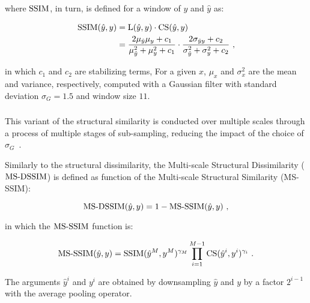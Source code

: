 \noindent where $\operatorname{SSIM}$, in turn, is defined for a window of $y$ and $\hat{y}$ as:

\begin{equation}
  \begin{aligned}
    \operatorname{SSIM}(\hat{y}, y)
     & = \operatorname{L}(\hat{y}, y) \cdot \operatorname{CS}(\hat{y}, y)                                                                                                                       \\
     & = \frac{2 \mu_{\hat{y}} \mu_{y} + c_1}{\mu_{\hat{y}}^2 + \mu_{y}^2 + c_1} \cdot \frac{2 \sigma_{\hat{y}y} + c_2}{\sigma_{\hat{y}}^2 + \sigma_{y}^2 + c_{2}}~\text{,}
  \end{aligned}
\end{equation}

\noindent in which $c_1$ and $c_2$ are stabilizing terms, 
For a given $x$, $\mu_{x}$ and $\sigma^2_{x}$ are the mean and variance, respectively, computed with a Gaussian filter with standard deviation $\sigma_{G} = 1.5$ and window size $11$.

\subsubsection{}

This variant of the structural similarity is conducted over multiple scales through a process of multiple stages of sub-sampling, reducing the impact of the choice of $\sigma_{G}$~\cite{zhao2016loss}.

Similarly to the structural dissimilarity, the Multi-scale Structural Dissimilarity ($\operatorname{MS-DSSIM}$) is defined as function of the Multi-scale Structural Similarity (MS-SSIM):

\begin{equation}
  \operatorname{MS-DSSIM}(\hat{y}, y) = 1 - \operatorname{MS-SSIM}(\hat{y}, y)~\text{,}
\end{equation}

\noindent in which the $\operatorname{MS-SSIM}$ function is:

\begin{equation}
  \operatorname{MS-SSIM}(\hat{y}, y) = \operatorname{SSIM}(\hat{y}^M, y^M)^{\gamma_M} \prod^{M - 1}_{i = 1}{\operatorname{CS}(\hat{y}^i, y^i)^{\gamma_i}}~\text{.}
\end{equation}

The arguments $\hat{y}^i$ and $y^i$ are obtained by downsampling $\hat{y}$ and $y$ by a factor $2^{i - 1}$ with the average pooling operator.

